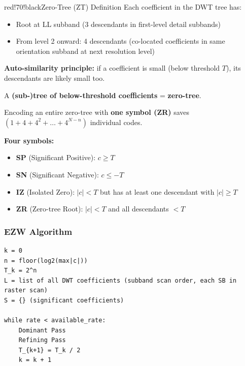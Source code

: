 \begin{calloutbox}{red!70!black}{Zero-Tree (ZT) Definition}
Each coefficient in the DWT tree has:
\begin{itemize}
\item Root at LL subband (3 descendants in first-level detail subbands)
\item From level 2 onward: 4 descendants (co-located coefficients in same orientation subband at next resolution level)
\end{itemize}

\textbf{Auto-similarity principle:} if a coefficient is small (below threshold $T$), its descendants are likely small too.

A \textbf{(sub-)tree of below-threshold coefficients} = \textbf{zero-tree}.

Encoding an entire zero-tree with \textbf{one symbol (ZR)} saves $(1 + 4 + 4^2 + \ldots + 4^{N-n})$ individual codes.
\end{calloutbox}

\begin{center}\end{center}

\textbf{Four symbols:}
\begin{itemize}
\item \textbf{SP} (Significant Positive): $c \geq T$
\item \textbf{SN} (Significant Negative): $c \leq -T$
\item \textbf{IZ} (Isolated Zero): $|c| < T$ but has at least one descendant with $|c| \geq T$
\item \textbf{ZR} (Zero-tree Root): $|c| < T$ and all descendants $< T$
\end{itemize}

\subsubsection{EZW Algorithm}

\begin{verbatim}
k = 0
n = floor(log2(max|c|))
T_k = 2^n
L = list of all DWT coefficients (subband scan order, each SB in raster scan)
S = {} (significant coefficients)

while rate < available_rate:
    Dominant Pass
    Refining Pass
    T_{k+1} = T_k / 2
    k = k + 1

\end{verbatim}

